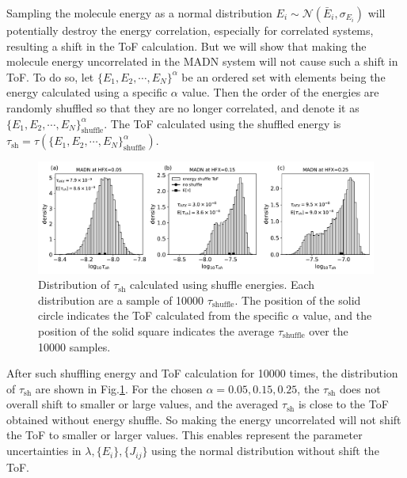 \documentclass[letterpaper,12pt]{article}
\begin{document}
Sampling the molecule energy as a normal distribution $E_i \sim \mathcal{N}(\bar{E}_i, \sigma_{E_i})$ will potentially destroy the energy correlation, especially for correlated systems, resulting a shift in the ToF calculation.
But we will show that making the molecule energy uncorrelated in the MADN system will not cause such a shift in ToF. 
To do so, let $\{E_1, E_2, \cdots, E_N\}^{\alpha}$ be an ordered set with elements being the energy calculated using a specific $\alpha$ value. 
Then the order of the energies are randomly shuffled so that they are no longer correlated, and denote it as $\{E_1, E_2, \cdots, E_N\}^{\alpha}_{\text{shuffle}}$. The ToF calculated using the shuffled energy is $ \tau_{\text{sh}} = \tau(\{E_1, E_2, \cdots, E_N\}^{\alpha}_{\text{shuffle}}) $.
%
\begin{figure}[H]
    \centering
    \includegraphics[width=\textwidth]{figs/MADN_HFX/ToFx_shuffle.pdf}
    \caption{Distribution of $\tau_{\text{sh}}$ calculated using shuffle energies. Each distribution are a sample of 10000 $\tau_{\text{shuffle}}$. The position of the solid circle indicates the ToF calculated from the specific $\alpha$ value, and the position of the solid square indicates the average $\tau_{\text{shuffle}}$ over the 10000 samples.}
    \label{fig:ToF_shuffle_MADN}
\end{figure}
%
After such shuffling energy and ToF calculation for 10000 times, the distribution of $\tau_{\text{sh}}$ are shown in Fig.\ref{fig:ToF_shuffle_MADN}. 
For the chosen $\alpha=0.05, 0.15, 0.25$, the $\tau_{\text{sh}}$ does not overall shift to smaller or large values, and the averaged $\tau_{\text{sh}}$ is close to the ToF obtained without energy shuffle.
So making the energy uncorrelated will not shift the ToF to smaller or larger values.
This enables represent the parameter uncertainties in $\lambda, \{E_i\}, \{ J_{ij}\}$ using the normal distribution without shift the ToF.
\end{document}
